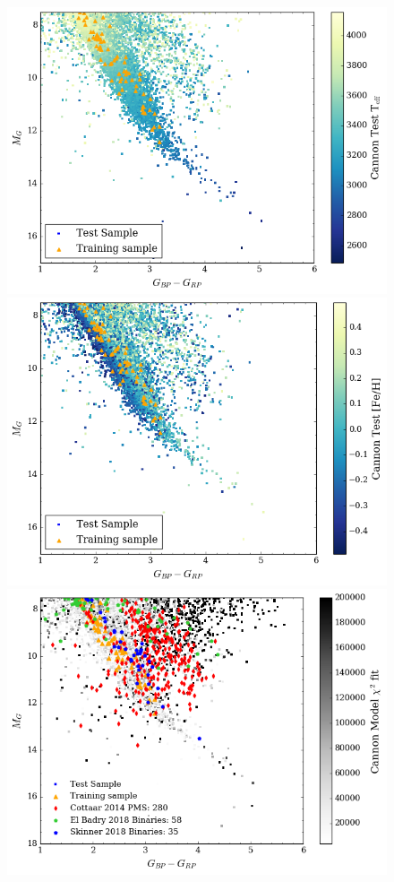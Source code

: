\documentclass[modern]{aastex62}
\begin{document}
\begin{figure}[!htb]
  \includegraphics[width=\linewidth]{figures/test_cmd_teff.png}
\endminipage\hfill
{}
  \includegraphics[width=\linewidth]{figures/test_cmd_feh.png}
\endminipage\hfill
{}%
  \includegraphics[width=\linewidth]{figures/test_cmd_chisq.png}
\endminipage
\end{figure}
\end{document}
